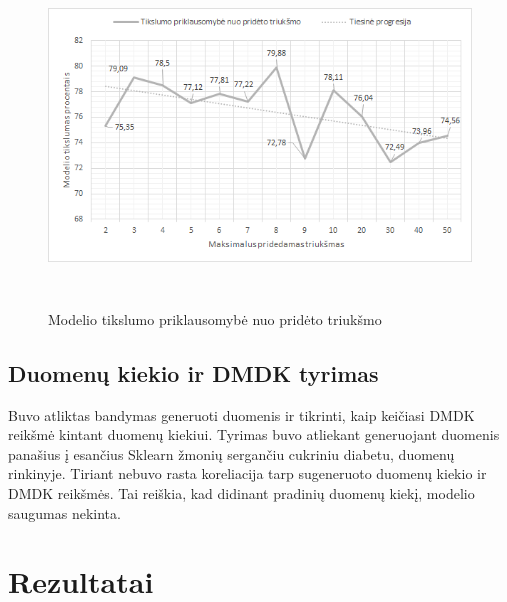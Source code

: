 \documentclass{VUMIFInfBakalaurinis}
\begin{document}
\begin{figure}[h]
  \centering
  \includegraphics[width=13cm,height=9cm,keepaspectratio]{img/tr_tyr_acc.png}
  \caption{Modelio tikslumo priklausomybė nuo pridėto triukšmo}
  \label{fig:Modelio tikslumo priklausomybė nuo pridėto triukšmo}
\end{figure}

\subsection{Duomenų kiekio ir DMDK tyrimas}
\par Buvo atliktas bandymas generuoti duomenis ir tikrinti, kaip keičiasi DMDK reikšmė kintant duomenų kiekiui. Tyrimas buvo atliekant generuojant duomenis panašius į esančius Sklearn žmonių sergančiu cukriniu diabetu, duomenų rinkinyje. Tiriant nebuvo rasta koreliacija tarp sugeneruoto duomenų kiekio ir DMDK reikšmės. Tai reiškia, kad didinant pradinių duomenų kiekį, modelio saugumas nekinta.

\section*{Rezultatai}
\end{document}
